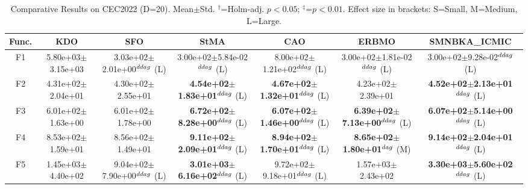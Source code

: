 \begin{table}[!t]
\centering\small
\caption{Comparative Results on CEC2022 (D=20). Mean$\pm$Std. $^{\dag}$=Holm-adj. $p<0.05$; $^{\ddag}$=$p<0.01$. Effect size in brackets: S=Small, M=Medium, L=Large.}
\label{tab:enhanced}
\begin{tabular}{c|cccccc}
\hline
Func. & \textbf{KDO} & SFO & StMA & CAO & ERBMO & SMNBKA_ICMIC \\ \hline\hline
F1  & 5.80e+03$\pm$3.15e+03  & 3.03e+02$\pm$2.01e+00$^{\\ddag}$ (L)  & 3.00e+02$\pm$5.84e-02$^{\\ddag}$ (L)  & 8.00e+02$\pm$1.21e+02$^{\\ddag}$ (L)  & 3.00e+02$\pm$1.81e-02$^{\\ddag}$ (L)  & 3.00e+02$\pm$9.28e-02$^{\\ddag}$ (L) \\ \hline
F2  & 4.31e+02$\pm$2.04e+01  & 4.30e+02$\pm$2.55e+01   & \textbf{4.54e+02$\pm$1.83e+01}$^{\\ddag}$ (L)  & \textbf{4.67e+02$\pm$1.32e+01}$^{\\ddag}$ (L)  & 4.23e+02$\pm$2.39e+01   & \textbf{4.52e+02$\pm$2.13e+01}$^{\\ddag}$ (L) \\ \hline
F3  & 6.01e+02$\pm$1.63e+00  & 6.01e+02$\pm$1.78e+00   & \textbf{6.72e+02$\pm$8.28e+00}$^{\\ddag}$ (L)  & \textbf{6.07e+02$\pm$1.46e+00}$^{\\ddag}$ (L)  & \textbf{6.39e+02$\pm$7.13e+00}$^{\\ddag}$ (L)  & \textbf{6.07e+02$\pm$5.14e+00}$^{\\ddag}$ (L) \\ \hline
F4  & 8.53e+02$\pm$1.59e+01  & 8.56e+02$\pm$1.49e+01   & \textbf{9.11e+02$\pm$2.09e+01}$^{\\ddag}$ (L)  & \textbf{8.94e+02$\pm$1.70e+01}$^{\\ddag}$ (L)  & \textbf{8.65e+02$\pm$1.80e+01}$^{\\dag}$ (M)  & \textbf{9.14e+02$\pm$2.04e+01}$^{\\ddag}$ (L) \\ \hline
F5  & 1.45e+03$\pm$4.40e+02  & 9.04e+02$\pm$7.90e+00$^{\\ddag}$ (L)  & \textbf{3.01e+03$\pm$6.16e+02}$^{\\ddag}$ (L)  & 9.72e+02$\pm$9.18e+01$^{\\ddag}$ (L)  & 1.57e+03$\pm$2.43e+02   & \textbf{3.30e+03$\pm$5.60e+02}$^{\\ddag}$ (L) \\ \hline

\end{tabular}
\end{table}
